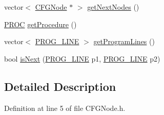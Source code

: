 \begin{DoxyCompactItemize}
vector$<$ \hyperlink{class_c_f_g_node}{C\-F\-G\-Node} $\ast$ $>$ \hyperlink{class_c_f_g_node_a715f4e65329fdd0948f39eaf44d37ebd}{get\-Next\-Nodes} ()
\item 
\hyperlink{std_afx_8h_aa07ea1d188c7b45668f1bd82ffd6d87e}{P\-R\-O\-C} \hyperlink{class_c_f_g_node_a2c9700b808aad05029293f0d1cd13b01}{get\-Procedure} ()
\item 
vector$<$ \hyperlink{std_afx_8h_abcc2d0120d16c2587a85b314010f6399}{P\-R\-O\-G\-\_\-\-L\-I\-N\-E} $>$ \hyperlink{class_c_f_g_node_a00d7decf2f7e7068accae7b2e59f4a7a}{get\-Program\-Lines} ()
\item 
bool \hyperlink{class_c_f_g_node_aa0b5bc3202db67e6834fb82fc7c059cf}{is\-Next} (\hyperlink{std_afx_8h_abcc2d0120d16c2587a85b314010f6399}{P\-R\-O\-G\-\_\-\-L\-I\-N\-E} p1, \hyperlink{std_afx_8h_abcc2d0120d16c2587a85b314010f6399}{P\-R\-O\-G\-\_\-\-L\-I\-N\-E} p2)
\end{DoxyCompactItemize}


\subsection{Detailed Description}


Definition at line 5 of file C\-F\-G\-Node.\-h.




